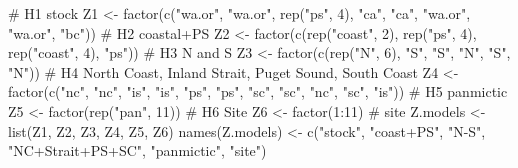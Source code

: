\begin{Schunk}
\begin{Sinput}
 # H1 stock
 Z1 <- factor(c("wa.or", "wa.or", rep("ps", 4), "ca", "ca", "wa.or", "wa.or", "bc"))
 # H2 coastal+PS
 Z2 <- factor(c(rep("coast", 2), rep("ps", 4), rep("coast", 4), "ps"))
 # H3 N and S
 Z3 <- factor(c(rep("N", 6), "S", "S", "N", "S", "N"))
 # H4 North Coast, Inland Strait, Puget Sound, South Coast
 Z4 <- factor(c("nc", "nc", "is", "is", "ps", "ps", "sc", "sc", "nc", "sc", "is"))
 # H5 panmictic
 Z5 <- factor(rep("pan", 11))
 # H6 Site
 Z6 <- factor(1:11) # site
 Z.models <- list(Z1, Z2, Z3, Z4, Z5, Z6)
 names(Z.models) <-
   c("stock", "coast+PS", "N-S", "NC+Strait+PS+SC", "panmictic", "site")
\end{Sinput}
\end{Schunk}
